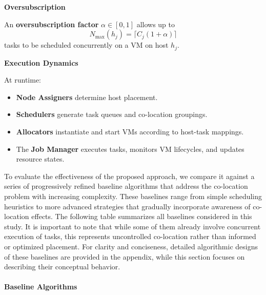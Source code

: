\textbf{Oversubscription}

An \textbf{oversubscription factor} $\alpha \in [0,1]$ allows up to
\[
    N_{\max}(h_j) = \lceil C_j (1 + \alpha) \rceil
\]
tasks to be scheduled concurrently on a VM on host $h_j$.


\textbf{Execution Dynamics}

At runtime:
\begin{itemize}
    \item \textbf{Node Assigners} determine host placement.
    \item \textbf{Schedulers} generate task queues and co-location groupings.
    \item \textbf{Allocators} instantiate and start VMs according to host-task mappings.
    \item The \textbf{Job Manager} executes tasks, monitors VM lifecycles, and updates resource states.
\end{itemize}

To evaluate the effectiveness of the proposed approach, we compare it against a series of progressively refined baseline algorithms that address the co-location problem with increasing complexity. These baselines range from simple scheduling heuristics to more advanced strategies that gradually incorporate awareness of co-location effects. The following table summarizes all baselines considered in this study. It is important to note that while some of them already involve concurrent execution of tasks, this represents uncontrolled co-location rather than informed or optimized placement. For clarity and conciseness, detailed algorithmic designs of these baselines are provided in the appendix, while this section focuses on describing their conceptual behavior.

\paragraph{Baseline Algorithms}
\label{sec:baseline_algorithms}

